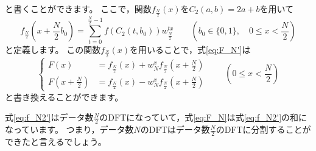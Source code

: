 \documentclass[uplatex, 11pt, a4j, dvipdfmx]{jsarticle}
\begin{document}
    と書くことができます。
    ここで，関数$f_\frac{N}{2}(x)$を$C_2(a, b) = 2a + b$を用いて
    \begin{equation}
        f_{\frac{N}{2}}(x + \frac{N}{2}b_0) = \sum_{t=0}^{\frac{N}{2}-1} f(C_2(t, b_0)) w^{tx}_{\frac{N}{2}}
                        \qquad (b_0 \in \{0, 1 \}, \quad 0 \le x < \frac{N}{2}) \label{eq:f_N2'}
    \end{equation}
    と定義します。
    この関数$f_{\frac{N}{2}}(x)$を用いることで，式\eqref{eq:F_N'}は
    \begin{equation}
        \left\{ \begin{aligned}
            F(x)               &= f_{\frac{N}{2}}(x) + w^{x}_{N} f_{\frac{N}{2}}(x + \frac{N}{2}) \\
            F(x + \frac{N}{2}) &= f_{\frac{N}{2}}(x) - w^{x}_{N} f_{\frac{N}{2}}(x + \frac{N}{2})
        \end{aligned} \right. \qquad (0 \le x < \frac{N}{2}) \label{eq:F_N}
    \end{equation}
    と書き換えることができます。

    式\eqref{eq:f_N2'}はデータ数$\frac{N}{2}$のDFTになっていて，式\eqref{eq:F_N}は式\eqref{eq:f_N2'}の和になっています。
    つまり，データ数$N$のDFTはデータ数$\frac{N}{2}$のDFTに分割することができたと言えるでしょう。
\end{document}
